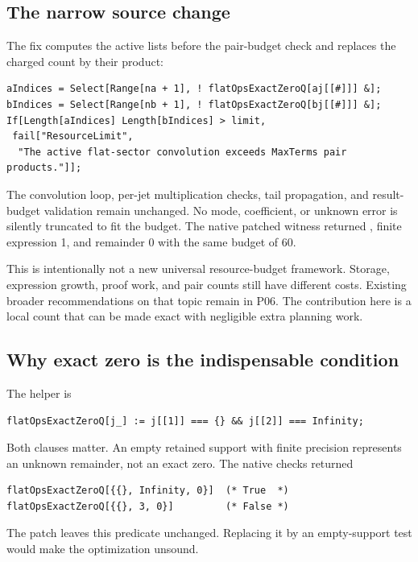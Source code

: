 \documentclass[11pt,a4paper]{article}
\newcommand{\code}[1]{\texttt{\detokenize{#1}}}
\begin{document}
\subsection{The narrow source change}
The fix computes the active lists before the pair-budget check and replaces the charged count by their product:
\begin{lstlisting}
aIndices = Select[Range[na + 1], ! flatOpsExactZeroQ[aj[[#]]] &];
bIndices = Select[Range[nb + 1], ! flatOpsExactZeroQ[bj[[#]]] &];
If[Length[aIndices] Length[bIndices] > limit,
 fail["ResourceLimit",
  "The active flat-sector convolution exceeds MaxTerms pair products."]];
\end{lstlisting}
The convolution loop, per-jet multiplication checks, tail propagation, and result-budget validation remain unchanged. No mode, coefficient, or unknown error is silently truncated to fit the budget. The native patched witness returned \code{GeneralizedSeries}, finite expression 1, and remainder 0 with the same budget of 60.

This is intentionally not a new universal resource-budget framework. Storage, expression growth, proof work, and pair counts still have different costs. Existing broader recommendations on that topic remain in P06. The contribution here is a local count that can be made exact with negligible extra planning work.

\subsection{Why exact zero is the indispensable condition}
The helper is
\begin{lstlisting}
flatOpsExactZeroQ[j_] := j[[1]] === {} && j[[2]] === Infinity;
\end{lstlisting}
Both clauses matter. An empty retained support with finite precision represents an unknown remainder, not an exact zero. The native checks returned
\begin{lstlisting}
flatOpsExactZeroQ[{{}, Infinity, 0}]  (* True  *)
flatOpsExactZeroQ[{{}, 3, 0}]         (* False *)
\end{lstlisting}
The patch leaves this predicate unchanged. Replacing it by an empty-support test would make the optimization unsound.
\end{document}
